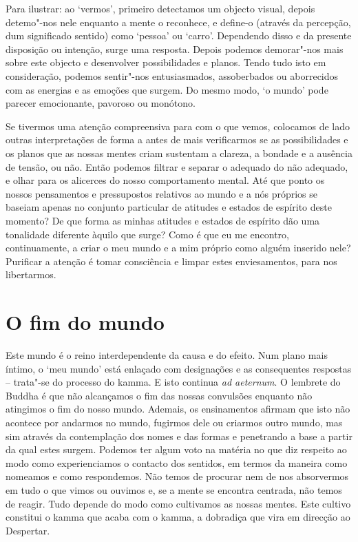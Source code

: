 Para ilustrar: ao `vermos', primeiro detectamos um objecto visual, depois
detemo"-nos nele enquanto a mente o reconhece, e define-o (através da percepção,
dum significado sentido) como `pessoa' ou `carro'. Dependendo disso e da
presente disposição ou intenção, surge uma resposta. Depois podemos demorar"-nos
mais sobre este objecto e desenvolver possibilidades e planos. Tendo tudo isto
em consideração, podemos sentir"-nos entusiasmados, assoberbados ou aborrecidos
com as energias e as emoções que surgem. Do mesmo modo, `o mundo' pode parecer
emocionante, pavoroso ou monótono.

Se tivermos uma atenção compreensiva para com o que vemos, colocamos de lado
outras interpretações de forma a antes de mais verificarmos se as possibilidades
e os planos que as nossas mentes criam sustentam a clareza, a bondade e a
ausência de tensão, ou não. Então podemos filtrar e separar o adequado do não
adequado, e olhar para os alicerces do nosso comportamento mental. Até que ponto
os nossos pensamentos e pressupostos relativos ao mundo e a nós próprios se
baseiam apenas no conjunto particular de atitudes e estados de espírito deste
momento? De que forma as minhas atitudes e estados de espírito dão uma
tonalidade diferente àquilo que surge? Como é que eu me encontro, continuamente,
a criar o meu mundo e a mim próprio como alguém inserido nele? Purificar a
atenção é tomar consciência e limpar estes enviesamentos, para nos libertarmos.

\section{O fim do mundo}

Este mundo é o reino interdependente da causa e do efeito. Num plano mais
íntimo, o `meu mundo' está enlaçado com designações e as consequentes respostas
-- trata"-se do processo do kamma. E isto continua \emph{ad aeternum}. O
lembrete do Buddha é que não alcançamos o fim das nossas convulsões enquanto não
atingimos o fim do nosso mundo.
Ademais, os ensinamentos afirmam que isto não acontece por andarmos no mundo,
fugirmos dele ou criarmos outro mundo, mas sim através da contemplação dos nomes
e das formas e penetrando a base a partir da qual estes surgem. Podemos ter
algum voto na matéria no que diz respeito ao modo como experienciamos o contacto
dos sentidos, em termos da maneira como nomeamos e como respondemos. Não temos
de procurar nem de nos absorvermos em tudo o que vimos ou ouvimos e, se a mente
se encontra centrada, não temos de reagir. Tudo depende do modo como cultivamos
as nossas mentes. Este cultivo constitui o kamma que acaba com o kamma, a
dobradiça que vira em direcção ao Despertar.

